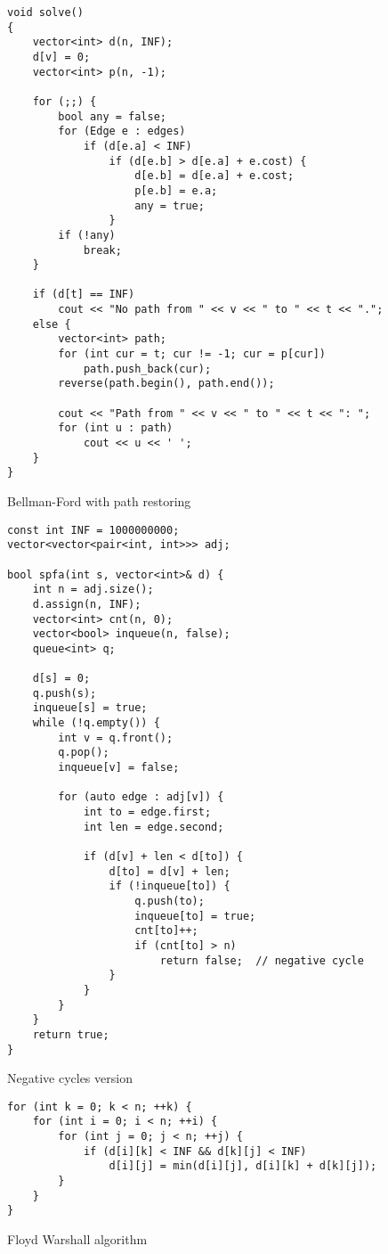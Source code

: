 \documentclass{article}
\begin{document}
\begin{lstlisting}
void solve()
{
    vector<int> d(n, INF);
    d[v] = 0;
    vector<int> p(n, -1);

    for (;;) {
        bool any = false;
        for (Edge e : edges)
            if (d[e.a] < INF)
                if (d[e.b] > d[e.a] + e.cost) {
                    d[e.b] = d[e.a] + e.cost;
                    p[e.b] = e.a;
                    any = true;
                }
        if (!any)
            break;
    }

    if (d[t] == INF)
        cout << "No path from " << v << " to " << t << ".";
    else {
        vector<int> path;
        for (int cur = t; cur != -1; cur = p[cur])
            path.push_back(cur);
        reverse(path.begin(), path.end());

        cout << "Path from " << v << " to " << t << ": ";
        for (int u : path)
            cout << u << ' ';
    }
}
\end{lstlisting}

Bellman-Ford with path restoring

\begin{lstlisting}
const int INF = 1000000000;
vector<vector<pair<int, int>>> adj;

bool spfa(int s, vector<int>& d) {
    int n = adj.size();
    d.assign(n, INF);
    vector<int> cnt(n, 0);
    vector<bool> inqueue(n, false);
    queue<int> q;

    d[s] = 0;
    q.push(s);
    inqueue[s] = true;
    while (!q.empty()) {
        int v = q.front();
        q.pop();
        inqueue[v] = false;

        for (auto edge : adj[v]) {
            int to = edge.first;
            int len = edge.second;

            if (d[v] + len < d[to]) {
                d[to] = d[v] + len;
                if (!inqueue[to]) {
                    q.push(to);
                    inqueue[to] = true;
                    cnt[to]++;
                    if (cnt[to] > n)
                        return false;  // negative cycle
                }
            }
        }
    }
    return true;
}

\end{lstlisting}

Negative cycles version

\begin{lstlisting}
for (int k = 0; k < n; ++k) {
    for (int i = 0; i < n; ++i) {
        for (int j = 0; j < n; ++j) {
            if (d[i][k] < INF && d[k][j] < INF)
                d[i][j] = min(d[i][j], d[i][k] + d[k][j]); 
        }
    }
}
\end{lstlisting}
Floyd Warshall algorithm
\end{document}

